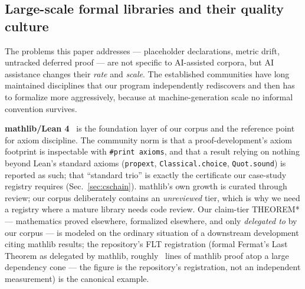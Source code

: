 
\subsection{Large-scale formal libraries and their quality culture}
\label{sec:related-libraries}
The problems this paper addresses --- placeholder declarations,
metric drift, untracked deferred proof --- are not specific to
AI-assisted corpora, but AI assistance changes their \emph{rate} and
\emph{scale}. The established communities have long maintained
disciplines that our program independently rediscovers and then has
to formalize more aggressively, because at machine-generation scale
no informal convention survives.

\textbf{mathlib/Lean 4}~\cite{mathlib4,lean4} is the foundation layer
of our corpus and the reference point for axiom discipline. The
community norm is that a proof-development's axiom footprint is
inspectable with \texttt{\#print axioms}, and that a result relying
on nothing beyond Lean's standard axioms
(\texttt{propext}, \texttt{Classical.choice}, \texttt{Quot.sound})
is reported as such; that ``standard trio'' is exactly the
certificate our case-study registry requires
(Sec.~\ref{sec:cschain}). mathlib's own growth is curated through
review; our corpus deliberately contains an \emph{unreviewed} tier,
which is why we need a registry where a mature library needs code
review. Our claim-tier THEOREM* --- mathematics proved elsewhere,
formalized elsewhere, and only \emph{delegated to} by our corpus ---
is modeled on the ordinary situation of a downstream development
citing mathlib results; the repository's FLT registration (formal
Fermat's Last Theorem as delegated by mathlib, roughly
~lines of mathlib proof atop a large dependency cone ---
the figure is the repository's registration, not an independent
measurement) is the canonical example.

